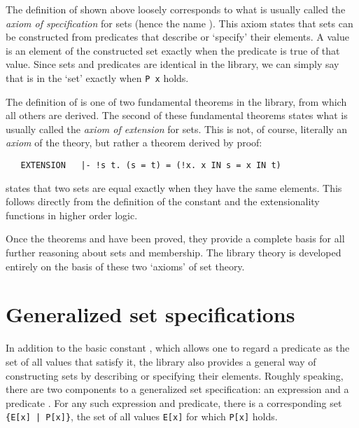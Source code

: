 The definition of  shown above loosely corresponds to what is usually
called the {\it axiom of specification\/} for
sets (hence the name ). This axiom states that sets can be
constructed from predicates that describe or `specify' their elements. A value
is an element of the constructed set exactly when the predicate is true of that
value.  Since sets and predicates are identical in the  library,
we can simply say that  is in the `set'  exactly when
{\small\verb!P x!} holds.

The definition of  is one of two fundamental theorems in the
 library, from which all others are derived.  The second of
these fundamental theorems states what is usually called the {\it axiom of
extension\/} for sets.  This is not, of course,
literally an {\it axiom\/} of the  theory, but rather a theorem
derived by proof:

\begin{hol}
\begin{verbatim}
   EXTENSION   |- !s t. (s = t) = (!x. x IN s = x IN t)
\end{verbatim}\end{hol}

\noindent {} states that two sets are equal exactly when they have
the same elements.  This follows directly from the definition of the constant
 and the extensionality functions in higher order logic.

Once the theorems  and  have been proved, they
provide a complete basis for all further reasoning about sets and membership.
The library theory  is developed entirely on the basis of these
two `axioms' of set theory.

\section{Generalized set specifications}

In addition to the basic constant , which allows one to regard a
predicate as the set of all values that satisfy it, the  library
also provides a general way of constructing sets by describing or specifying
their elements.  Roughly speaking, there are two components to a generalized
set specification: an expression  and a predicate . For any
such expression and predicate, there is a corresponding set 
{\small\verb!{E[x] | P[x]}!}, the set of all values {\small\verb!E[x]!} for
which {\small\verb!P[x]!} holds.

